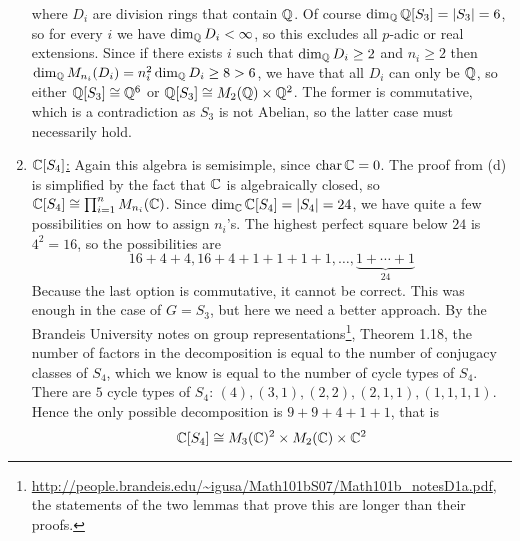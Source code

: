 \documentclass[a4paper, 12pt]{article}
\begin{document}
\begin{Exercise}
\begin{enumerate}[label=(\alph*)]
            where $D_i$ are division rings that contain $\mathbb{Q}$.
            Of course $\dim_{\mathbb{Q}}\mathbb{Q}[S_3] = |S_3| = 6$, so for every $i$ we have $\dim_{\mathbb{Q}} D_i < \infty$,
            so this excludes all $p$-adic or real extensions.
            Since if there exists $i$ such that $\dim_{\mathbb{Q}} D_i \geq 2$ and $n_i \geq 2$ then $\dim_{\mathbb{Q}} M_{n_i}(D_i) = n_i^2\dim_{\mathbb{Q}} D_i \geq 8 > 6$,
            we have that all $D_i$ can only be $\mathbb{Q}$, so either $\mathbb{Q}[S_3] \cong \mathbb{Q}^6$ or $\mathbb{Q}[S_3] \cong M_2(\mathbb{Q})\times \mathbb{Q}^2$.
            The former is commutative, which is a contradiction as $S_3$ is not Abelian, so the latter case must necessarily hold.
        \item \underline{$\mathbb{C}[S_4]$:}
            Again this algebra is semisimple, since $\operatorname{char}\mathbb{C} = 0$.
            The proof from (d) is simplified by the fact that $\mathbb{C}$ is algebraically closed,
            so $\mathbb{C}[S_4] \cong \prod_{i=1}^{n}M_{n_i}(\mathbb{C})$.
            Since $\dim_{\mathbb{C}} \mathbb{C}[S_4] = |S_4| = 24$, we have quite a few possibilities on how to assign $n_i$'s.
            The highest perfect square below $24$ is $4^2 = 16$, so the possibilities are
            \[
                16+4+4, 16+4+1+1+1+1,\dots,\underbrace{1+\cdots+1}_{24}
            \]
            Because the last option is commutative, it cannot be correct.
            This was enough in the case of $G = S_3$, but here we need a better approach.
            By the Brandeis University notes on group representations\footnote{\url{http://people.brandeis.edu/~igusa/Math101bS07/Math101b_notesD1a.pdf}, the statements of the two lemmas that prove this are longer than their proofs.},
            Theorem 1.18, the number of factors in the decomposition is equal to the number of conjugacy classes of $S_4$,
            which we know is equal to the number of cycle types of $S_4$.
            There are $5$ cycle types of $S_4$: $(4),(3, 1), (2,2), (2, 1, 1), (1, 1, 1, 1)$.
            Hence the only possible decomposition is $9 + 9 + 4 + 1+ 1$, that is
            \[
                \mathbb{C}[S_4] \cong M_3(\mathbb{C})^2 \times M_2(\mathbb{C}) \times \mathbb{C}^2
            \]
    \end{enumerate}
\end{Exercise}
\end{document}
